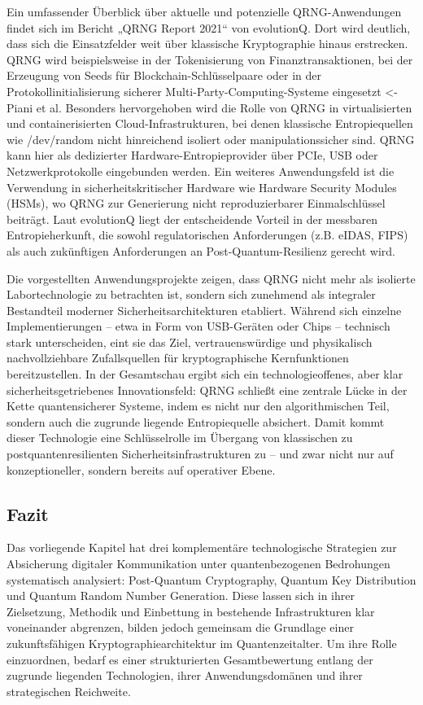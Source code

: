 Ein umfassender Überblick über aktuelle und potenzielle QRNG-Anwendungen findet sich im Bericht „QRNG Report 2021“ von evolutionQ. Dort wird deutlich, dass sich die Einsatzfelder weit über klassische Kryptographie hinaus erstrecken. QRNG wird beispielsweise in der Tokenisierung von Finanztransaktionen, bei der Erzeugung von Seeds für Blockchain-Schlüsselpaare oder in der Protokollinitialisierung sicherer Multi-Party-Computing-Systeme eingesetzt \cite{??????} <- Piani et al. Besonders hervorgehoben wird die Rolle von QRNG in virtualisierten und containerisierten Cloud-Infrastrukturen, bei denen klassische Entropiequellen wie /dev/random nicht hinreichend isoliert oder manipulationssicher sind. QRNG kann hier als dedizierter Hardware-Entropieprovider über PCIe, USB oder Netzwerkprotokolle eingebunden werden. Ein weiteres Anwendungsfeld ist die Verwendung in sicherheitskritischer Hardware wie Hardware Security Modules (HSMs), wo QRNG zur Generierung nicht reproduzierbarer Einmalschlüssel beiträgt. Laut evolutionQ liegt der entscheidende Vorteil in der messbaren Entropieherkunft, die sowohl regulatorischen Anforderungen (z.B. eIDAS, FIPS) als auch zukünftigen Anforderungen an Post-Quantum-Resilienz gerecht wird.

Die vorgestellten Anwendungsprojekte zeigen, dass QRNG nicht mehr als isolierte Labortechnologie zu betrachten ist, sondern sich zunehmend als integraler Bestandteil moderner Sicherheitsarchitekturen etabliert. Während sich einzelne Implementierungen – etwa in Form von USB-Geräten oder Chips – technisch stark unterscheiden, eint sie das Ziel, vertrauenswürdige und physikalisch nachvollziehbare Zufallsquellen für kryptographische Kernfunktionen bereitzustellen. In der Gesamtschau ergibt sich ein technologieoffenes, aber klar sicherheitsgetriebenes Innovationsfeld: QRNG schließt eine zentrale Lücke in der Kette quantensicherer Systeme, indem es nicht nur den algorithmischen Teil, sondern auch die zugrunde liegende Entropiequelle absichert. Damit kommt dieser Technologie eine Schlüsselrolle im Übergang von klassischen zu postquantenresilienten Sicherheitsinfrastrukturen zu – und zwar nicht nur auf konzeptioneller, sondern bereits auf operativer Ebene.

\subsection{Fazit}
Das vorliegende Kapitel hat drei komplementäre technologische Strategien zur Absicherung digitaler Kommunikation unter quantenbezogenen Bedrohungen systematisch analysiert: Post-Quantum Cryptography, Quantum Key Distribution und Quantum Random Number Generation. Diese lassen sich in ihrer Zielsetzung, Methodik und Einbettung in bestehende Infrastrukturen klar voneinander abgrenzen, bilden jedoch gemeinsam die Grundlage einer zukunftsfähigen Kryptographiearchitektur im Quantenzeitalter. Um ihre Rolle einzuordnen, bedarf es einer strukturierten Gesamtbewertung entlang der zugrunde liegenden Technologien, ihrer Anwendungsdomänen und ihrer strategischen Reichweite.

